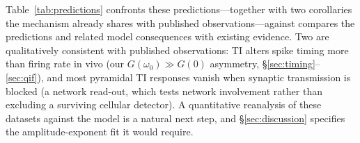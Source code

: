 \documentclass[11pt,a4paper]{article}
\providecommand{\DIFaddtex}[1]{{\protect\color{blue} \sf #1}} %
\providecommand{\DIFdeltex}[1]{{\protect\color{red} \scriptsize #1}} %
\providecommand{\DIFaddbegin}{} %
\providecommand{\DIFaddend}{} %
\providecommand{\DIFdelbegin}{} %
\providecommand{\DIFdelend}{} %
\providecommand{\DIFadd}[1]{\texorpdfstring{\DIFaddtex{#1}}{#1}} %
\providecommand{\DIFdel}[1]{\texorpdfstring{\DIFdeltex{#1}}{}} %
\begin{document}
Table~\ref{tab:predictions} \DIFdelbegin \DIFdel{confronts these predictions---together with two corollaries
the mechanism already shares with published observations---against }\DIFdelend \DIFaddbegin \DIFadd{compares the predictions and related model consequences
with }\DIFaddend existing evidence.
Two are qualitatively consistent with published observations: TI alters spike timing
more than firing rate in vivo \cite{vieira2024} (our $G(\omega_0)\!\gg\!G(0)$ asymmetry,
\S\ref{sec:timing}--\ref{sec:qif}), and most pyramidal TI responses vanish when synaptic
transmission is blocked \cite{caldas2024} (a network read-out, which tests network
involvement rather than excluding a surviving cellular detector). A
quantitative reanalysis of these datasets against the model is a natural next step, and
\S\ref{sec:discussion} specifies the amplitude-exponent fit it would require.
\end{document}
